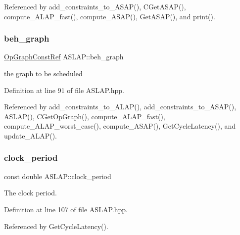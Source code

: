 Referenced by add\+\_\+constraints\+\_\+to\+\_\+\+A\+S\+A\+P(), C\+Get\+A\+S\+A\+P(), compute\+\_\+\+A\+L\+A\+P\+\_\+fast(), compute\+\_\+\+A\+S\+A\+P(), Get\+A\+S\+A\+P(), and print().

\mbox{\label{classASLAP_a1066ae8f856575d11ab7d9a4ec847e9a}} 
\subsubsection{\texorpdfstring{beh\+\_\+graph}{beh\_graph}}
{\footnotesize\ttfamily \hyperlink{op__graph_8hpp_a9a0b240622c47584bee6951a6f5de746}{Op\+Graph\+Const\+Ref} A\+S\+L\+A\+P\+::beh\+\_\+graph\hspace{0.3cm}{\ttfamily [private]}}



the graph to be scheduled 



Definition at line 91 of file A\+S\+L\+A\+P.\+hpp.



Referenced by add\+\_\+constraints\+\_\+to\+\_\+\+A\+L\+A\+P(), add\+\_\+constraints\+\_\+to\+\_\+\+A\+S\+A\+P(), A\+S\+L\+A\+P(), C\+Get\+Op\+Graph(), compute\+\_\+\+A\+L\+A\+P\+\_\+fast(), compute\+\_\+\+A\+L\+A\+P\+\_\+worst\+\_\+case(), compute\+\_\+\+A\+S\+A\+P(), Get\+Cycle\+Latency(), and update\+\_\+\+A\+L\+A\+P().

\mbox{\label{classASLAP_af86d05e7a3d89bf59095526832efc59f}} 
\subsubsection{\texorpdfstring{clock\+\_\+period}{clock\_period}}
{\footnotesize\ttfamily const double A\+S\+L\+A\+P\+::clock\+\_\+period\hspace{0.3cm}{\ttfamily [private]}}



The clock period. 



Definition at line 107 of file A\+S\+L\+A\+P.\+hpp.



Referenced by Get\+Cycle\+Latency().

